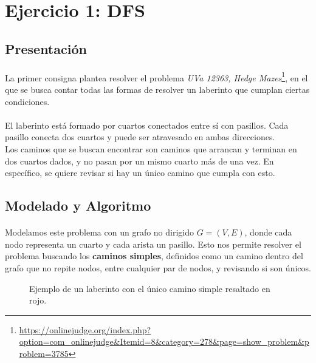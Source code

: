 \documentclass[../main.tex]{subfiles}
\begin{document}
\section{Ejercicio 1: DFS}
\label{sec:ej1}

\subsection{Presentación}
\label{sec:ej1-intro}
\paragraph{} La primer consigna plantea resolver el problema \textit{UVa 12363, Hedge Mazes}\footnote{\url{https://onlinejudge.org/index.php?option=com_onlinejudge&Itemid=8&category=278&page=show_problem&problem=3785}}, en el que se busca contar todas las formas de resolver un laberinto que cumplan ciertas condiciones.

\paragraph{} El laberinto está formado por cuartos conectados entre sí con pasillos. Cada pasillo conecta dos cuartos y puede ser atravesado en ambas direcciones. \\
Los caminos que se buscan encontrar son caminos que arrancan y terminan en dos cuartos dados, y no pasan por un mismo cuarto más de una vez. En específico, se quiere revisar si hay un único camino que cumpla con esto.

\subsection{Modelado y Algoritmo}
\label{sec:ej1-modeling}
\paragraph{} Modelamos este problema con un grafo no dirigido \(G = (V, E)\), donde cada nodo representa un cuarto y cada arista un pasillo. Esto nos permite resolver el problema buscando los \textbf{caminos simples}, definidos como un camino dentro del grafo que no repite nodos, entre cualquier par de nodos, y revisando si son únicos.

\begin{figure}[H]
\centering

  
\caption{Ejemplo de un laberinto con el único camino simple resaltado en rojo.}
\label{fig:ej1-ex}
\end{figure}
\end{document}
